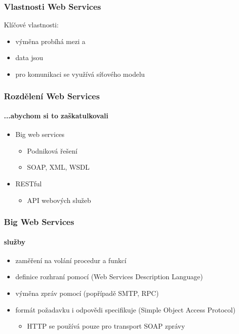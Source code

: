 \documentclass[12pt]{beamer}
\begin{document}
\begin{frame}
  \frametitle{Vlastnosti Web Services}

  \begin{block}{Klíčové vlastnosti:}
    \begin{itemize}
      \item výměna probíhá mezi  a 
      \item data jsou 
      \item pro komunikaci se využívá  síťového modelu
    \end{itemize}
  \end{block}
\end{frame}

\begin{frame}
  \frametitle{Rozdělení Web Services}
  \framesubtitle{...abychom si to zaškatulkovali}
	\begin{itemize}
      \item {\LARGE Big web services}
		\begin{itemize}
			\item Podniková řešení
			\item SOAP, XML, WSDL
		\end{itemize}
      \vspace{1cm}
      \item {\LARGE RESTful}
		\begin{itemize}
			\item API webových služeb
		\end{itemize}
    \end{itemize}
\end{frame}

\begin{frame}
	\frametitle{Big Web Services}
	\framesubtitle{ služby}
	\begin{itemize}
		\item zaměření na volání procedur a funkcí
		\item definice rozhraní pomocí  (Web Services Description Language)
		\item výměna zpráv pomocí  (popřípadě SMTP, RPC)
		\item formát požadavku i odpovědi specifikuje  (Simple Object Access Protocol)
		\begin{itemize}
			\item HTTP se používá pouze pro transport SOAP zprávy
		\end{itemize}
	\end{itemize}
\end{frame}
\end{document}
